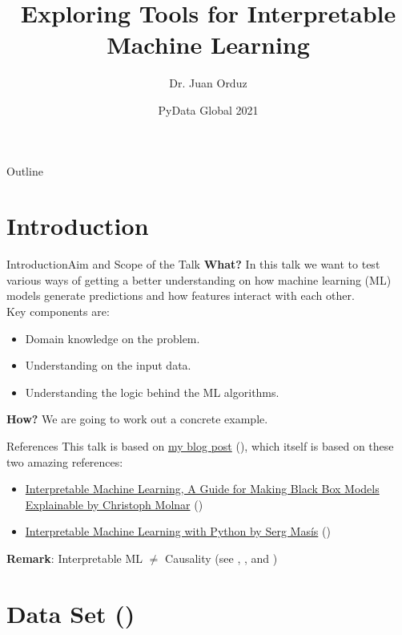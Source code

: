 \documentclass[10pt]{beamer}
\title[Exploring Tools for Interpretable Machine Learning] %
{Exploring Tools for Interpretable Machine Learning}
\author[Dr. Juan Orduz] %
{Dr. Juan Orduz}
\institute[PyData Global 2021] %
{}
\date[PyData Global 2021] %
{PyData Global 2021}
\begin{document}
\begin{frame}
  \titlepage
\end{frame}

\begin{frame}{Outline}
\tableofcontents
\end{frame}

\section{Introduction}

\begin{frame}{Introduction}{Aim and Scope of the Talk}
{\bf What?} In this talk we want to test various ways of getting a better understanding on how machine learning (ML) models generate predictions and how features interact with each other. \\

Key components are:
\begin{itemize}
\item Domain knowledge on the problem. 
\item Understanding on the input data.
\item Understanding the logic behind the ML algorithms.
\end{itemize}
\pause
{\bf How?} We are going to work out a concrete example.
\begin{block}{References}
This talk is based on \href{https://juanitorduz.github.io/interpretable_ml/}{my blog post} (\cite{interpretable_ml_orduz_2021}), which itself is based on these two amazing references:
\begin{itemize}
\item \href{https://christophm.github.io/interpretable-ml-book/}{Interpretable Machine Learning, A Guide for Making Black Box Models Explainable by Christoph Molnar} (\cite{molnar2019})
\item \href{https://github.com/PacktPublishing/Interpretable-Machine-Learning-with-Python}{Interpretable Machine Learning with Python by Serg Mas\'is} (\cite{masis2021})
\end{itemize}
\end{block}
{\bf Remark}: Interpretable ML $\neq$ Causality (see \cite{10.2307/j.ctv1c29t27}, \cite{tdd_sl}, \cite{statrethinkingbook} and \cite{molnar2020interpretable})
\end{frame}

\section{Data Set (\cite{molnar2019})}
\end{document}
